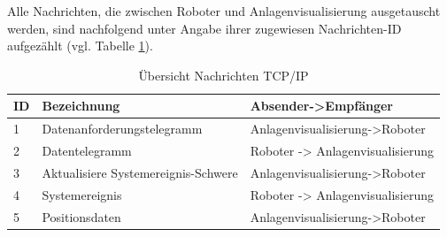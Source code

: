 \documentclass[ a4paper,
                oneside,
                toc=bibliography,
                toc=listof
                ]{scrbook}
\begin{document}
	Alle Nachrichten, die zwischen Roboter und Anlagenvisualisierung ausgetauscht werden, sind nachfolgend unter Angabe ihrer zugewiesen Nachrichten-ID aufgezählt (vgl. Tabelle \ref{table:NachrichtenTCPIP}).
	\begin{longtable}{p{0.5cm}p{6.5cm}p{6cm}}
		\caption{Übersicht Nachrichten TCP/IP}
		\label{table:NachrichtenTCPIP}\\
		\hline
		ID & Bezeichnung & Absender->Empfänger  \\ [0.5ex] 
		\hline
		\endhead
		1 & Datenanforderungstelegramm & Anlagenvisualisierung->Roboter \\ 
		2 & Datentelegramm & Roboter -> Anlagenvisualisierung \\
		3 & Aktualisiere Systemereignis-Schwere & Anlagenvisualisierung->Roboter \\
		4 & Systemereignis & Roboter -> Anlagenvisualisierung \\
		5 & Positionsdaten & Anlagenvisualisierung->Roboter \\

		\hline
	\end{longtable}
	
	
\end{document}
